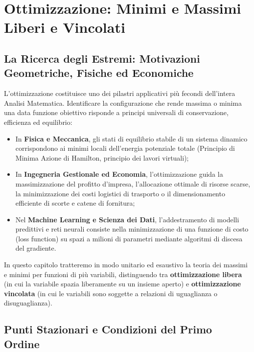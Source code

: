 
\chapter{Ottimizzazione: Minimi e Massimi Liberi e Vincolati}
\label{chap:minimi_e_massimi}

\section{La Ricerca degli Estremi: Motivazioni Geometriche, Fisiche ed Economiche}

L'ottimizzazione costituisce uno dei pilastri applicativi più fecondi dell'intera Analisi Matematica. Identificare la configurazione che rende massima o minima una data funzione obiettivo risponde a principi universali di conservazione, efficienza ed equilibrio:
\begin{itemize}
    \item In \textbf{Fisica e Meccanica}, gli stati di equilibrio stabile di un sistema dinamico corrispondono ai minimi locali dell'energia potenziale totale (Principio di Minima Azione di Hamilton, principio dei lavori virtuali);
    \item In \textbf{Ingegneria Gestionale ed Economia}, l'ottimizzazione guida la massimizzazione del profitto d'impresa, l'allocazione ottimale di risorse scarse, la minimizzazione dei costi logistici di trasporto o il dimensionamento efficiente di scorte e catene di fornitura;
    \item Nel \textbf{Machine Learning e Scienza dei Dati}, l'addestramento di modelli predittivi e reti neurali consiste nella minimizzazione di una funzione di costo (loss function) su spazi a milioni di parametri mediante algoritmi di discesa del gradiente.
\end{itemize}

In questo capitolo tratteremo in modo unitario ed esaustivo la teoria dei massimi e minimi per funzioni di più variabili, distinguendo tra \textbf{ottimizzazione libera} (in cui la variabile spazia liberamente su un insieme aperto) e \textbf{ottimizzazione vincolata} (in cui le variabili sono soggette a relazioni di uguaglianza o disuguaglianza).

\section{Punti Stazionari e Condizioni del Primo Ordine}

